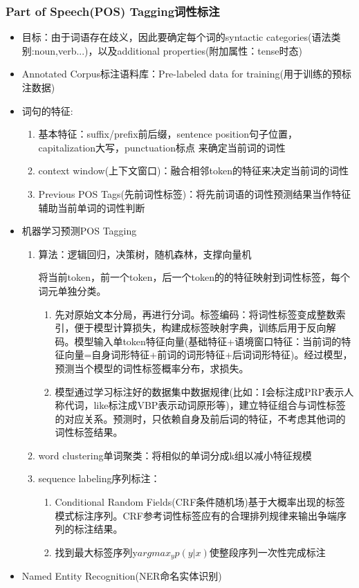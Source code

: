 \documentclass[UTF8]{ctexart}
\begin{document}
\subsubsection{Part of Speech(POS) Tagging词性标注}
\begin{itemize}
    \item 目标：由于词语存在歧义，因此要确定每个词的syntactic categories(语法类别:noun,verb...)，以及additional properties(附加属性：tense时态)
    \item Annotated Corpus标注语料库：Pre-labeled data for training(用于训练的预标注数据)
    \item 词句的特征:
    \begin{enumerate}
        \item 基本特征：suffix/prefix前后缀，sentence position句子位置，capitalization大写，punctuation标点 来确定当前词的词性
        \item context window(上下文窗口)：融合相邻token的特征来决定当前词的词性
        \item Previous POS Tags(先前词性标签)：将先前词语的词性预测结果当作特征辅助当前单词的词性判断
    \end{enumerate}
    \item 机器学习预测POS Tagging
    \begin{enumerate}
        \item 算法：逻辑回归，决策树，随机森林，支撑向量机
        
        将当前token，前一个token，后一个token的的特征映射到词性标签，每个词元单独分类。
        \begin{enumerate}
            \item 先对原始文本分局，再进行分词。标签编码：将词性标签变成整数索引，便于模型计算损失，构建成标签映射字典，训练后用于反向解码。模型输入单token特征向量(基础特征+语境窗口特征：当前词的特征向量=自身词形特征+前词的词形特征+后词词形特征)。经过模型，预测当个模型的词性标签概率分布，求损失。
            \item 模型通过学习标注好的数据集中数据规律(比如：I会标注成PRP表示人称代词，like标注成VBP表示动词原形等)，建立特征组合与词性标签的对应关系。预测时，只依赖自身及前后词的特征，不考虑其他词的词性标签结果。
        \end{enumerate}
        \item word clustering单词聚类：将相似的单词分成k组以减小特征规模
        \item sequence labeling序列标注：
        \begin{enumerate}
            \item Conditional Random Fields(CRF条件随机场)基于大概率出现的标签模式标注序列。CRF参考词性标签应有的合理排列规律来输出争端序列的标注结果。
            \item 找到最大标签序列y$argmax_{y}p(y|x)$使整段序列一次性完成标注
        \end{enumerate}
    \end{enumerate}
    \item Named Entity Recognition(NER命名实体识别)
    

\end{itemize}
\end{document}
